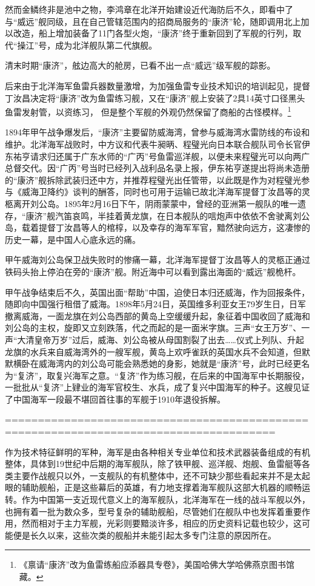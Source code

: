 \documentclass[12pt,UTF8]{ctexbook}
\begin{document}
然而金鳞终非是池中之物，李鸿章在北洋开始建设近代海防后不久，即看中了与“威远”舰同级，且在自己管辖范围内的招商局服务的“康济”轮，随即调用北上加以改造，船上增加装备了11门各型火炮，“康济”终于重新回到了军舰的行列，取代“操江”号，成为北洋舰队第二代旗舰。

清末时期“康济”，舷边高大的舱房，已看不出一点“威远”级军舰的踪影。

后来由于北洋海军鱼雷兵器数量激增，为加强鱼雷专业技术知识的培训起见，提督丁汝昌决定将“康济”改为鱼雷练习舰，又在“康济”舰上安装了2具14英寸口径黑头鱼雷发射管，以资练习， 但是整个军舰的外观仍然保留了商船的古怪模样。\footnote{《禀请“康济”改为鱼雷练船应添器具专卷》，美国哈佛大学哈佛燕京图书馆藏。}

1894年甲午战争爆发后，“康济”主要留防威海湾，曾参与威海湾水雷防线的布设和维护。北洋海军战败时，中方议和代表牛昶昞、程璧光向日本联合舰队司令长官伊东祐亨请求归还属于广东水师的“广丙”号鱼雷巡洋舰，以便未来程璧光可以向两广总督交代。因“广丙”号当时已经列入战利品名录上报，伊东祐亨遂提出将尚未造册的“康济”舰拆除武装归还中方，并推荐程璧光出任管带，以此既是作为对程璧光参与《威海卫降约》谈判的酬答，同时也可用于运输已故北洋海军提督丁汝昌等的灵柩离开刘公岛。1895年2月16日下午，阴雨蒙蒙中，曾经的亚洲第一舰队的唯一遗存，“康济”舰汽笛哀鸣，半挂着黄龙旗，在日本舰队的唁炮声中依依不舍驶离刘公岛，载着提督丁汝昌等人的棺椁，以及幸存的海军军官，黯然驶向远方，这凄惨的历史一幕，是中国人心底永远的痛。

甲午威海刘公岛保卫战失败时的惨痛一幕，北洋海军提督丁汝昌等人的灵柩正通过铁码头抬上停泊在旁的“康济”舰。附近海中可以看到露出海面的“威远”舰桅杆。

甲午战争结束后不久，英国出面“帮助”中国，迫使日本归还威海，作为回报条件，随即向中国强行租借了威海。1898年5月24日，英国维多利亚女王79岁生日，日军撤离威海，一面龙旗在刘公岛西部的黄岛上空缓缓升起，象征着中国收回了威海和刘公岛的主权，旋即又立刻跌落，代之而起的是一面米字旗。三声“女王万岁”、一声“大清皇帝万岁”过后，威海、刘公岛被从母国割裂了出去……仪式上列队、升起龙旗的水兵来自威海湾外的一艘军舰，黄岛上欢呼雀跃的英国水兵不会知道，但默默横卧在威海湾内的刘公岛可能会熟悉她的身影，她就是“康济”号，此时已经更名为“复济”，取复兴海军之意。“复济”作为练习舰，在后来的中国海军中长期服役，一批批从“复济”上肄业的海军官校生、水兵，成了复兴中国海军的种子。这艘见证了中国海军一段最不堪回首往事的军舰于1910年退役拆解。

=======================================================================================

作为技术特征鲜明的军种，海军是由各种相关专业单位和技术武器装备组成的有机整体，具体到19世纪中后期的海军舰队，除了铁甲舰、巡洋舰、炮舰、鱼雷艇等各类主要作战舰只以外，一支舰队的有机整体中，还不可缺少那些看起来并不是太起眼的辅助舰船，正是这些幕后的英雄，有力地支撑着海军舰队这部大机器的顺畅运转。作为中国第一支近现代意义上的海军舰队，北洋海军在一线的战斗军舰以外，也拥有着一批为数众多，型号复杂的辅助舰船，尽管她们在舰队中也发挥着重要作用，然而相对于主力军舰，光彩则要黯淡许多，相应的历史资料记载也较少，这可能便是长久以来，这些次类的舰船并未能引起太多专门注意的原因所在。
\end{document}
